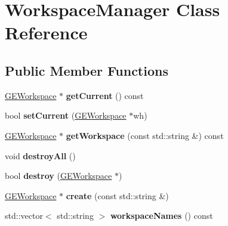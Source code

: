 \hypertarget{class_workspace_manager}{}\section{Workspace\+Manager Class Reference}
\label{class_workspace_manager}
\subsection*{Public Member Functions}
\begin{DoxyCompactItemize}
\item 
\mbox{\label{class_workspace_manager_ad102029477579a5529cd12e0332578a8}} 
\hyperlink{class_g_e_workspace}{G\+E\+Workspace} $\ast$ {\bfseries get\+Current} () const
\item 
\mbox{\label{class_workspace_manager_a1aee8705de2d071b6cce59dc83081ff6}} 
bool {\bfseries set\+Current} (\hyperlink{class_g_e_workspace}{G\+E\+Workspace} $\ast$wh)
\item 
\mbox{\label{class_workspace_manager_ac3f6b018529fdaca7f36ca9637bb4361}} 
\hyperlink{class_g_e_workspace}{G\+E\+Workspace} $\ast$ {\bfseries get\+Workspace} (const std\+::string \&) const
\item 
\mbox{\label{class_workspace_manager_a5a50cb8c0943409770b0e99ce43cd4d3}} 
void {\bfseries destroy\+All} ()
\item 
\mbox{\label{class_workspace_manager_a3d94a98f51e2ff65c32b39aba1493854}} 
bool {\bfseries destroy} (\hyperlink{class_g_e_workspace}{G\+E\+Workspace} $\ast$)
\item 
\mbox{\label{class_workspace_manager_ac043289ca971369537d9e766494b3522}} 
\hyperlink{class_g_e_workspace}{G\+E\+Workspace} $\ast$ {\bfseries create} (const std\+::string \&)
\item 
\mbox{\label{class_workspace_manager_a4d8dc4d06db48f7ef91d4a97b149aa4e}} 
std\+::vector$<$ std\+::string $>$ {\bfseries workspace\+Names} () const
\item 
\mbox{\label{class_workspace_manager_a770a3273fd3e16feb38546059382a2ea}} 

\end{DoxyCompactItemize}
